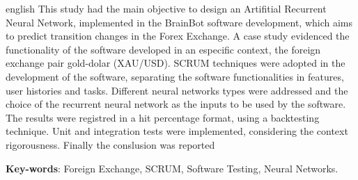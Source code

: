 \begin{resumo}[Abstract]
 \begin{otherlanguage*}{english}
   This study had the main objective to design an Artifitial Recurrent Neural Network,
   implemented in the BrainBot software development, which aims to predict transition
   changes in the Forex Exchange. A case study evidenced the functionality of the software
   developed in an especific context, the foreign exchange pair gold-dolar (XAU/USD).
   SCRUM techniques were adopted in the development of the software, separating the
   software functionalities in features, user histories and tasks. Different neural
   networks types were addressed and the choice of the recurrent neural network as the inputs
   to be used by the software. The results were registred in a hit percentage format,
   using a backtesting technique. Unit and integration tests were implemented, considering
   the context rigorousness. Finally the conslusion was reported
   \vspace{\onelineskip}

   \noindent
   \textbf{Key-words}: Foreign Exchange, SCRUM, Software Testing, Neural Networks.
 \end{otherlanguage*}
\end{resumo}
